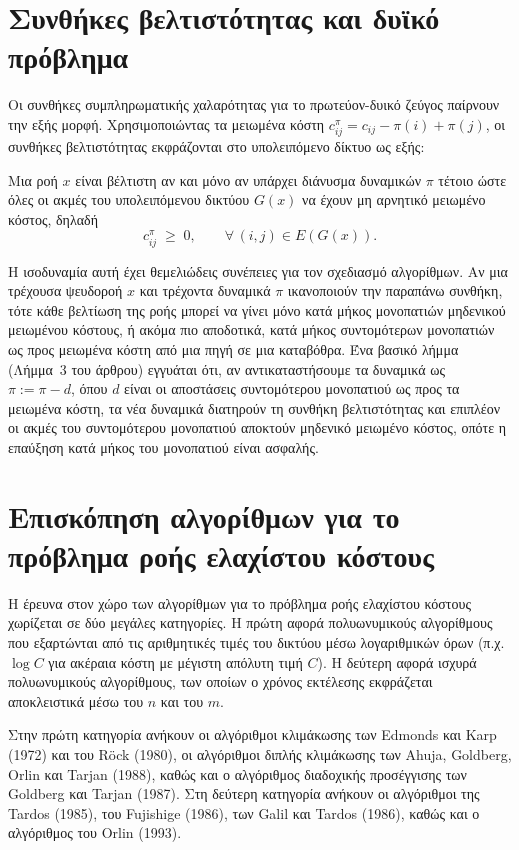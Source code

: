 \documentclass[11pt,a4paper,oneside]{report}
\begin{document}
\section{Συνθήκες βελτιστότητας και δυϊκό πρόβλημα}

Οι συνθήκες συμπληρωματικής χαλαρότητας για το πρωτεύον-δυικό ζεύγος παίρνουν την εξής μορφή. Χρησιμοποιώντας τα μειωμένα κόστη $c^{\pi}_{ij} = c_{ij} - \pi(i) + \pi(j)$, οι συνθήκες βελτιστότητας εκφράζονται στο υπολειπόμενο δίκτυο ως εξής:

Μια ροή $x$ είναι βέλτιστη αν και μόνο αν υπάρχει διάνυσμα δυναμικών $\pi$ τέτοιο ώστε όλες οι ακμές του υπολειπόμενου δικτύου $G(x)$ να έχουν μη αρνητικό μειωμένο κόστος, δηλαδή
\[
c^{\pi}_{ij} \;\geq\; 0, \qquad \forall\, (i,j) \in E(G(x)).
\]

Η ισοδυναμία αυτή έχει θεμελιώδεις συνέπειες για τον σχεδιασμό αλγορίθμων. Αν μια τρέχουσα ψευδοροή $x$ και τρέχοντα δυναμικά $\pi$ ικανοποιούν την παραπάνω συνθήκη, τότε κάθε βελτίωση της ροής μπορεί να γίνει μόνο κατά μήκος μονοπατιών μηδενικού μειωμένου κόστους, ή ακόμα πιο αποδοτικά, κατά μήκος συντομότερων μονοπατιών ως προς μειωμένα κόστη από μια πηγή σε μια καταβόθρα. Ένα βασικό λήμμα (Λήμμα~3 του άρθρου) εγγυάται ότι, αν αντικαταστήσουμε τα δυναμικά ως $\pi := \pi - d$, όπου $d$ είναι οι αποστάσεις συντομότερου μονοπατιού ως προς τα μειωμένα κόστη, τα νέα δυναμικά διατηρούν τη συνθήκη βελτιστότητας και επιπλέον οι ακμές του συντομότερου μονοπατιού αποκτούν μηδενικό μειωμένο κόστος, οπότε η επαύξηση κατά μήκος του μονοπατιού είναι ασφαλής.

\section{Επισκόπηση αλγορίθμων για το πρόβλημα ροής ελαχίστου κόστους}

Η έρευνα στον χώρο των αλγορίθμων για το πρόβλημα ροής ελαχίστου κόστους χωρίζεται σε δύο μεγάλες κατηγορίες. Η πρώτη αφορά πολυωνυμικούς αλγορίθμους που εξαρτώνται από τις αριθμητικές τιμές του δικτύου μέσω λογαριθμικών όρων (π.χ.\ $\log C$ για ακέραια κόστη με μέγιστη απόλυτη τιμή $C$). Η δεύτερη αφορά ισχυρά πολυωνυμικούς αλγορίθμους, των οποίων ο χρόνος εκτέλεσης εκφράζεται αποκλειστικά μέσω του $n$ και του $m$.

Στην πρώτη κατηγορία ανήκουν οι αλγόριθμοι κλιμάκωσης των \textenglish{Edmonds} και \textenglish{Karp} (1972) και του \textenglish{Röck} (1980), οι αλγόριθμοι διπλής κλιμάκωσης των \textenglish{Ahuja}, \textenglish{Goldberg}, \textenglish{Orlin} και \textenglish{Tarjan} (1988), καθώς και ο αλγόριθμος διαδοχικής προσέγγισης των \textenglish{Goldberg} και \textenglish{Tarjan} (1987). Στη δεύτερη κατηγορία ανήκουν οι αλγόριθμοι της \textenglish{Tardos} (1985), του \textenglish{Fujishige} (1986), των \textenglish{Galil} και \textenglish{Tardos} (1986), καθώς και ο αλγόριθμος του \textenglish{Orlin} (1993).
\end{document}
